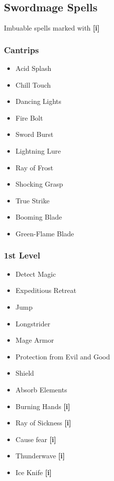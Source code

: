 \clearpage

\begin{multicols*}{3}
\begin{small}
        
    
 
\section*{Swordmage Spells}

Imbuable spells marked with \textbf{[i]}

\subsubsection{Cantrips}

\begin{itemize}

\item Acid Splash
\item Chill Touch
\item Dancing Lights
\item Fire Bolt
\item Sword Burst
\item Lightning Lure
\item Ray of Frost
\item Shocking Grasp
\item True Strike 
\item Booming Blade
\item Green-Flame Blade 
\end{itemize}

\subsubsection{1st Level}

\begin{itemize}
\item Detect Magic
\item Expeditious Retreat
\item Jump
\item Longstrider
\item Mage Armor
\item Protection from Evil and Good
\item Shield
\item Absorb Elements 
\item Burning Hands \textbf{[i]}
\item Ray of Sickness \textbf{[i]}
\item Cause fear \textbf{[i]}
\item Thunderwave \textbf{[i]}
\item Ice Knife \textbf{[i]}
\end{itemize}



\end{small}
\end{multicols*}
